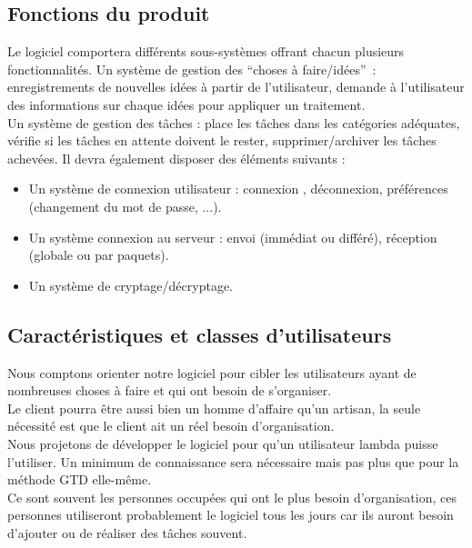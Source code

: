 	\subsection{Fonctions du produit}
Le logiciel comportera différents sous-systèmes offrant chacun plusieurs fonctionnalités.
Un système de gestion des ``choses à faire/idées''~: enregistrements de nouvelles idées à partir de l'utilisateur, demande à l'utilisateur des informations sur chaque idées pour appliquer un traitement.
\\
Un système de gestion des tâches : place les tâches dans les catégories adéquates, vérifie si les tâches en attente doivent le rester, supprimer/archiver les tâches achevées.
Il devra également disposer des éléments suivants :
\begin{itemize}
\item Un système de connexion utilisateur : connexion , déconnexion, préférences (changement du mot de passe, ...).
\item Un système connexion au serveur : envoi (immédiat ou différé), réception (globale ou par paquets).
\item Un système de cryptage/décryptage.
\end{itemize}



	\subsection{Caractéristiques et classes d'utilisateurs}

Nous comptons orienter notre logiciel pour cibler les utilisateurs ayant de nombreuses choses à faire et qui ont besoin de s'organiser.
\\
Le client pourra être aussi bien un homme d'affaire qu'un artisan, la seule nécessité est que le client ait un réel besoin d'organisation.
\\
Nous projetons de développer le logiciel pour qu'un utilisateur lambda puisse l'utiliser. Un minimum de connaissance sera nécessaire mais pas plus que pour la méthode GTD elle-même.
\\
Ce sont souvent les personnes occupées qui ont le plus besoin d'organisation, ces personnes utiliseront probablement le logiciel tous les jours car ils auront besoin  d'ajouter ou de réaliser des tâches souvent.

